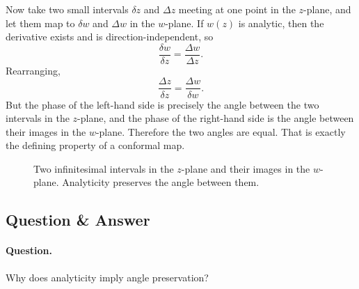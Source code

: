 Now take two small intervals \(\delta z\) and \(\Delta z\) meeting at one point in the \(z\)-plane, and let them map to \(\delta w\) and \(\Delta w\) in the \(w\)-plane. If \(w(z)\) is analytic, then the derivative exists and is direction-independent, so
\begin{equation}
\frac{\delta w}{\delta z}=\frac{\Delta w}{\Delta z}.
\end{equation}
Rearranging,
\begin{equation}
\frac{\Delta z}{\delta z}=\frac{\Delta w}{\delta w}.
\end{equation}
But the phase of the left-hand side is precisely the angle between the two intervals in the \(z\)-plane, and the phase of the right-hand side is the angle between their images in the \(w\)-plane. Therefore the two angles are equal. That is exactly the defining property of a conformal map.

\begin{figure}[h]
\centering
{}
\caption{Two infinitesimal intervals in the \(z\)-plane and their images in the \(w\)-plane. Analyticity preserves the angle between them.}
\end{figure}

\subsection{Question \& Answer}

\paragraph{Question.} Why does analyticity imply angle preservation?

